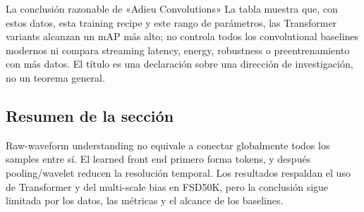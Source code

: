 \begin{warningbox}{La conclusión razonable de «Adieu Convolutions»}
La tabla muestra que, con estos datos, esta training recipe y este rango de parámetros, las Transformer variants alcanzan un mAP más alto; no controla todos los convolutional baselines modernos ni compara streaming latency, energy, robustness o preentrenamiento con más datos. El título es una declaración sobre una dirección de investigación, no un teorema general.
\end{warningbox}


\subsection{Resumen de la sección}

Raw-waveform understanding no equivale a conectar globalmente todos los samples entre sí. El learned front end primero forma tokens, y después pooling/wavelet reducen la resolución temporal. Los resultados respaldan el uso de Transformer y del multi-scale bias en FSD50K, pero la conclusión sigue limitada por los datos, las métricas y el alcance de los baselines.
